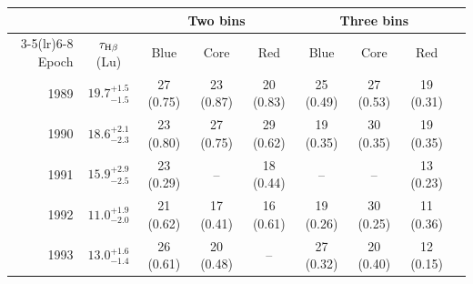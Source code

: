 \begin{tabular}{rcccccccc}
\toprule
 & & \multicolumn{3}{c}{Two bins} & \multicolumn{3}{c}{Three bins} \\
\cmidrule(lr){3-5}\cmidrule(lr){6-8}
Epoch & $\tau_{\rm H\beta}$ (Lu) & Blue & Core & Red & Blue & Core & Red \\
\midrule
1989 & $19.7^{+1.5}_{-1.5}$ & 27 (0.75) & 23 (0.87) & 20 (0.83) & 25 (0.49) & 27 (0.53) & 19 (0.31) \\
1990 & $18.6^{+2.1}_{-2.3}$ & 23 (0.80) & 27 (0.75) & 29 (0.62) & 19 (0.35) & 30 (0.35) & 19 (0.35) \\
1991 & $15.9^{+2.9}_{-2.5}$ & 23 (0.29) & -- & 18 (0.44) & -- & -- & 13 (0.23) \\
1992 & $11.0^{+1.9}_{-2.0}$ & 21 (0.62) & 17 (0.41) & 16 (0.61) & 19 (0.26) & 30 (0.25) & 11 (0.36) \\
1993 & $13.0^{+1.6}_{-1.4}$ & 26 (0.61) & 20 (0.48) & -- & 27 (0.32) & 20 (0.40) & 12 (0.15) \\
\bottomrule
\end{tabular}
